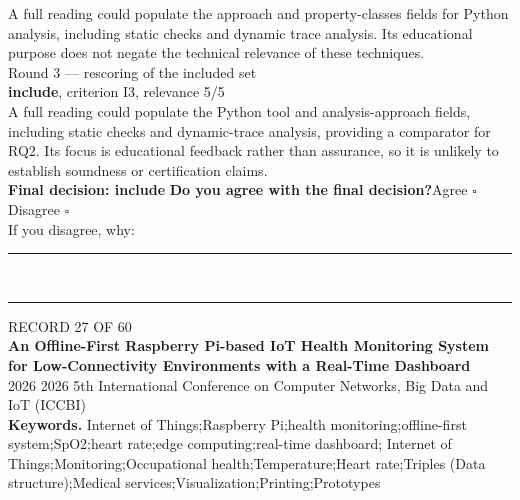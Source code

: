 \documentclass[11pt,a4paper]{article}
\begin{document}
{\small A full reading could populate the approach and property-classes fields for Python analysis, including static checks and dynamic trace analysis. Its educational purpose does not negate the technical relevance of these techniques.}\\[2.5mm]
{\footnotesize\color{soft}Round 3 --- rescoring of the included set}\\[0.5mm]
{\small\textbf{include}, criterion I3, relevance 5/5}\\[0.5mm]
{\small A full reading could populate the Python tool and analysis-approach fields, including static checks and dynamic-trace analysis, providing a comparator for RQ2. Its focus is educational feedback rather than assurance, so it is unlikely to establish soundness or certification claims.}\\[2.5mm]
{\small\textbf{Final decision: include}}
\vspace{2mm}
{\small\textbf{Do you agree with the final decision?}\quad{}Agree $\square$\qquad{}Disagree $\square$}\\[1mm]
{\footnotesize\color{soft}If you disagree, why:}\\[1mm]
\color{rule}\rule{\linewidth}{0.3pt}\\[3mm]\rule{\linewidth}{0.3pt}\color{black}
\clearpage
{\color{soft}\footnotesize RECORD 27 OF 60}\\[1mm]
{\large\bfseries An Offline-First Raspberry Pi-based IoT Health Monitoring System for Low-Connectivity Environments with a Real-Time Dashboard}\\[1.5mm]
{\color{soft}\small 2026 \textperiodcentered{} 2026 5th International Conference on Computer Networks, Big Data and IoT (ICCBI)}\\[2mm]
{\small\textbf{Keywords.} Internet of Things;Raspberry Pi;health monitoring;offline-first system;SpO2;heart rate;edge computing;real-time dashboard; Internet of Things;Monitoring;Occupational health;Temperature;Heart rate;Triples (Data structure);Medical services;Visualization;Printing;Prototypes}\\[2mm]
\end{document}
